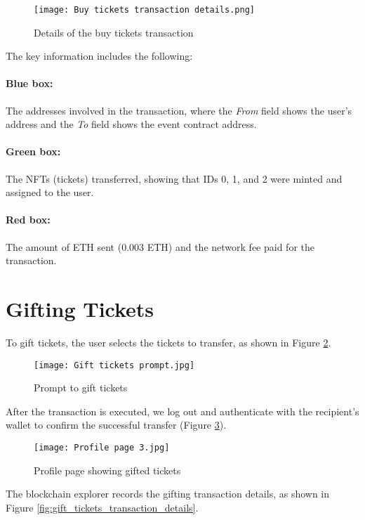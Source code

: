 \begin{figure}[H]
    \texttt{[image: Buy tickets transaction details.png]}
    \centering
    \caption{Details of the buy tickets transaction}
    \label{fig:buy_tickets_transaction_details}
\end{figure}

The key information includes the following:
\paragraph{Blue box:} The addresses involved in the transaction, where the \textit{From} field shows
the user's address and the \textit{To} field shows the event contract address.
\paragraph{Green box:} The NFTs (tickets) transferred, showing that IDs 0, 1, and 2 were minted and
assigned to the user.
\paragraph{Red box:} The amount of ETH sent (0.003 ETH) and the network fee paid for the
transaction.

\section{Gifting Tickets}
\label{sec:gift_tickets}

To gift tickets, the user selects the tickets to transfer, as shown in Figure
\ref{fig:gift_tickets_prompt}.

\begin{figure}[H]
    \texttt{[image: Gift tickets prompt.jpg]}
    \centering
    \caption{Prompt to gift tickets}
    \label{fig:gift_tickets_prompt}
\end{figure}

After the transaction is executed, we log out and authenticate with the
recipient's wallet to confirm the successful transfer (Figure
\ref{fig:profile_page_3}).

\begin{figure}[H]
    \texttt{[image: Profile page 3.jpg]}
    \centering
    \caption{Profile page showing gifted tickets}
    \label{fig:profile_page_3}
\end{figure}

The blockchain explorer records the gifting transaction details, as shown in
Figure \ref{fig:gift_tickets_transaction_details}.

